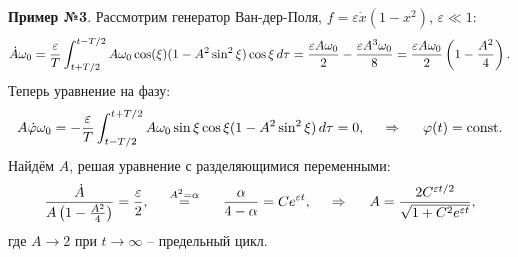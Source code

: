 \textbf{Пример №3}. Рассмотрим генератор Ван-дер-Поля, $f = \varepsilon \dot{x} (1-x^2)$, $\varepsilon \ll 1$:
\begin{equation*}
    \dot{A} \omega_0 = \frac{\varepsilon}{T} \int_{t+T/2}^{t-T/2} A \omega_0 \cos(\xi) (1- A^2 \sin^2 \xi) \cos \xi \, d \tau = 
    \frac{\varepsilon A \omega_0}{2} - \frac{\varepsilon A^3 \omega_0}{8} = \frac{\varepsilon A \omega_0}{2} \left(1 - \frac{A^2}{4}\right).
\end{equation*}
Теперь уравнение на фазу:
\begin{equation*}
    A \dot{\varphi} \omega_0 = - \frac{\varepsilon}{T} \int_{t-T/2}^{t+T/2} A \omega_0 \sin \xi \cos \xi (1 - A^2 \sin^2 \xi) \, d \tau = 0,
    \hspace{0.5cm} \Rightarrow \hspace{0.5cm}
    \varphi(t) = \textnormal{const}.
\end{equation*}
Найдём $A$, решая уравнение с разделяющимися переменными:
\begin{equation*}
    \frac{\dot{A}}{A\left(1 - \frac{A^2}{4}\right)} = \frac{\varepsilon}{2},
    \hspace{0.5cm} \overset{A^2 = \alpha}{=} \hspace{0.5cm}
    \frac{\alpha}{4-\alpha} = C e^{\varepsilon t},
    \hspace{0.5cm} \Rightarrow \hspace{0.5cm}
    A = \frac{2 C ^{\varepsilon t/2}}{\sqrt{1 + C^2 e^{\varepsilon t}}},
\end{equation*}
где $A \to 2$ при $t \to \infty$ -- предельный цикл.


